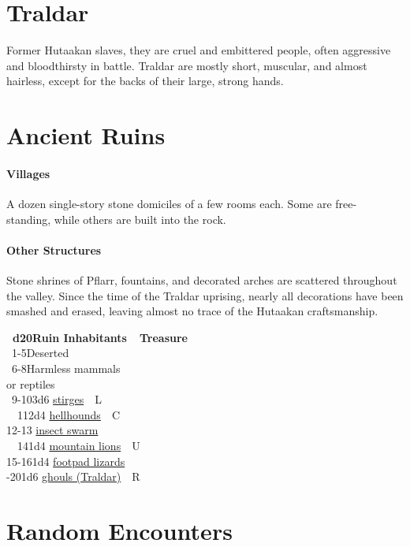 \documentclass[english,11pt,openany,letterpaper,twocolumn]{book}
\begin{document}
\section{Traldar}

Former Hutaakan slaves, they are cruel and embittered people, often aggressive and bloodthirsty in battle. Traldar are mostly short, muscular, and almost hairless, except for the backs of their large, strong hands.

\section{Ancient Ruins}

\paragraph{Villages}

A dozen single-story stone domiciles of a few rooms each. Some are free- standing, while others are built into the rock.

\paragraph{Other Structures}
Stone shrines of Pflarr, fountains, and decorated arches are scattered throughout the valley. Since the time of the Traldar uprising, nearly all decorations have been smashed and erased, leaving almost no trace of the Hutaakan craftsmanship.

\skipline

\ulf\textbf{~d20\tab Ruin Inhabitants~~Treasure}\\
~1-5\tab	Deserted\\
~6-8\tab	Harmless mammals\\
	or reptiles\\
~9-10\tab	3d6 \hyperlink{stirge}{stirges}~~L\\
~~11\tab	2d4 \hyperlink{hellhound}{hellhounds}~~C\\
12-13 \hyperlink{swarm}{insect swarm}\\
~~14\tab	1d4 \hyperlink{lion}{mountain lions}~~U\\
15-16\tab	1d4 \hyperlink{lizard}{footpad lizards}\\
-20\tab	1d6 \hyperlink{ghoul}{ghouls (Traldar)}~~R\\

\break

\section{Random Encounters}
\end{document}
